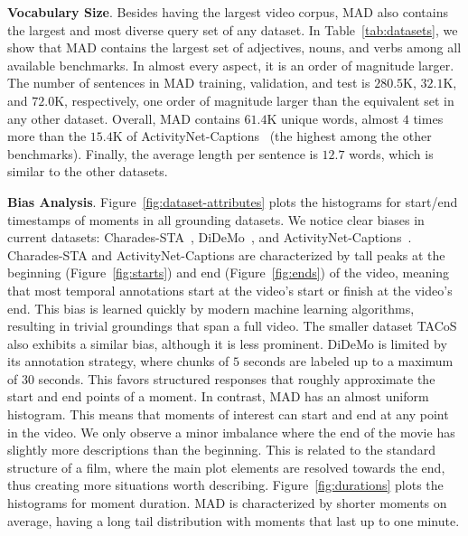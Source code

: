 \documentclass[10pt,twocolumn,letterpaper]{article}
\renewcommand{\paragraph}[1]{\vspace{1mm}\noindent\textbf{#1}.}
\begin{document}
\paragraph{Vocabulary Size} Besides having the largest video corpus, MAD also contains the largest and most diverse query set of any dataset. In Table~\ref{tab:datasets}, we show that MAD contains the largest set of adjectives, nouns, and verbs among all available benchmarks. In almost every aspect, it is an order of magnitude larger. The number of sentences in MAD training, validation, and test is $280.5$K, $32.1$K, and $72.0$K, respectively, one order of magnitude larger than the equivalent set in any other dataset. Overall, MAD contains $61.4$K unique words, almost $4$ times more than the $15.4$K of ActivityNet-Captions~\cite{Krishna_2017_ICCV} (the highest among the other benchmarks). Finally, the average length per sentence is $12.7$ words, which is similar to the other datasets.

\paragraph{Bias Analysis} Figure~\ref{fig:dataset-attributes} plots the histograms for start/end timestamps of moments in all grounding datasets. We notice clear biases in current datasets: Charades-STA~\cite{Gao_2017_ICCV}, DiDeMo~\cite{Hendricks_2017_ICCV}, and ActivityNet-Captions~\cite{Krishna_2017_ICCV}. 
Charades-STA and ActivityNet-Captions are characterized by tall peaks at the beginning (Figure~\ref{fig:starts}) and end (Figure~\ref{fig:ends}) of the video, meaning that most temporal annotations start at the video's start or finish at the video's end. This bias is learned quickly by modern machine learning algorithms, resulting in trivial groundings that span a full video. The smaller dataset TACoS also exhibits a similar bias, although it is less prominent. DiDeMo is limited by its annotation strategy, where chunks of $5$ seconds are labeled up to a maximum of $30$ seconds. This favors structured responses that roughly approximate the start and end points of a moment. In contrast, MAD has an almost uniform histogram. This means that moments of interest can start and end at any point in the video. 
We only observe a minor imbalance where the end of the movie has slightly more descriptions than the beginning. This is related to the standard structure of a film, where the main plot elements are resolved towards the end, thus creating more situations worth describing. 
Figure~\ref{fig:durations} plots the histograms for moment duration. MAD is characterized by shorter moments on average, having a long tail distribution with moments that last up to one minute.
\end{document}
